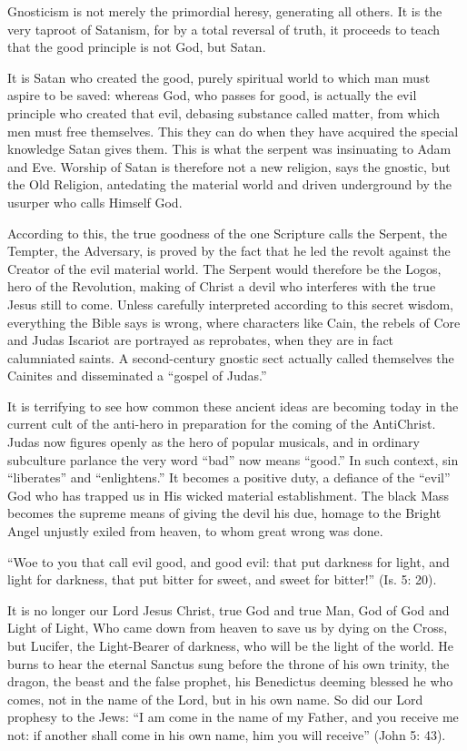 Gnosticism is not merely the primordial heresy, generating all others. It is the very taproot of Satanism, for by a total reversal of truth, it proceeds to teach that the good principle is not God, but Satan.

It is Satan who created the good, purely spiritual world to which man must aspire to be saved: whereas God, who passes for good, is actually the evil principle who created that evil, debasing substance called matter, from which men must free themselves. This they can do when they have acquired the special knowledge Satan gives them. This is what the serpent was insinuating to Adam and Eve. Worship of Satan is therefore not a new religion, says the gnostic, but the Old Religion, antedating the material world and driven underground by the usurper who calls Himself God.

According to this, the true goodness of the one Scripture calls the Serpent, the Tempter, the Adversary, is proved by the fact that he led the revolt against the Creator of the evil material world. The Serpent would therefore be the Logos, hero of the Revolution, making of Christ a devil who interferes with the true Jesus still to come. Unless carefully interpreted according to this secret wisdom, everything the Bible says is wrong, where characters like Cain, the rebels of Core and Judas Iscariot are portrayed as reprobates, when they are in fact calumniated saints. A second-century gnostic sect actually called themselves the Cainites and disseminated a ``gospel of Judas.''

It is terrifying to see how common these ancient ideas are becoming today in the current cult of the anti-hero in preparation for the coming of the AntiChrist. Judas now figures openly as the hero of popular musicals, and in ordinary subculture parlance the very word ``bad'' now means ``good.'' In such context, sin ``liberates'' and ``enlightens.'' It becomes a positive duty, a defiance of the ``evil'' God who has trapped us in His wicked material establishment. The black Mass becomes the supreme means of giving the devil his due, homage to the Bright Angel unjustly exiled from heaven, to whom great wrong was done.

``Woe to you that call evil good, and good evil: that put darkness for light, and light for darkness, that put bitter for sweet, and sweet for bitter!'' (Is. 5: 20).

It is no longer our Lord Jesus Christ, true God and true Man, God of God and Light of Light, Who came down from heaven to save us by dying on the Cross, but Lucifer, the Light-Bearer of darkness, who will be the light of the world. He burns to hear the eternal Sanctus sung before the throne of his own trinity, the dragon, the beast and the false prophet, his Benedictus deeming blessed he who comes, not in the name of the Lord, but in his own name. So did our Lord prophesy to the Jews: ``I am come in the name of my Father, and you receive me not: if another shall come in his own name, him you will receive'' (John 5: 43).

